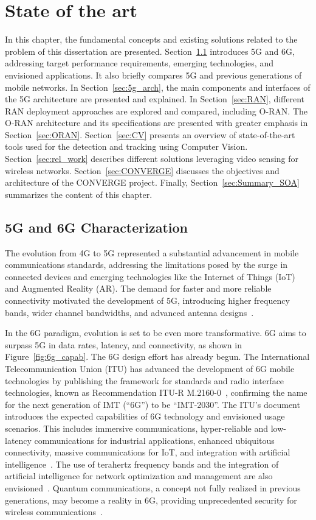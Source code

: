 \chapter{State of the art}\label{ch:state-of-the-art}

In this chapter, the fundamental concepts and existing solutions related to the problem of
this dissertation are presented.
Section~\ref{sec:6g_charac} introduces 5G and 6G, addressing target performance requirements, emerging technologies, and envisioned applications.
It also briefly compares 5G and previous generations of mobile networks.
In Section~\ref{sec:5g_arch}, the main components and interfaces of the 5G architecture are presented and explained.
In Section~\ref{sec:RAN}, different RAN deployment approaches are explored and compared, including O-RAN. The O-RAN architecture and its specifications are presented with greater emphasis in Section~\ref{sec:ORAN}.
Section~\ref{sec:CV} presents an overview of state-of-the-art tools used for the detection and tracking using Computer Vision.
Section~\ref{sec:rel_work} describes different solutions leveraging video sensing for wireless networks.
Section~\ref{sec:CONVERGE} discusses the objectives and architecture of the CONVERGE project.
Finally, Section~\ref{sec:Summary_SOA} summarizes the content of this chapter.

\section{5G and 6G Characterization} \label{sec:6g_charac}
The evolution from 4G to 5G represented a substantial advancement in mobile communications standards, addressing the limitations posed by the surge in connected devices and emerging technologies like the Internet of Things (IoT) and Augmented Reality (AR). The demand for faster and more reliable connectivity motivated the development of 5G, introducing higher frequency bands, wider channel bandwidths, and advanced antenna designs~\cite{5G_apps}.

In the 6G paradigm, evolution is set to be even more transformative.
6G aims to surpass 5G in data rates, latency, and connectivity, as shown in Figure~\ref{fig:6g_capab}.
The 6G design effort has already begun.
The International Telecommunication Union (ITU) has advanced the development of 6G mobile technologies by publishing the framework for standards and radio interface technologies, known as Recommendation ITU-R M.2160-0~\cite{ITU_2160-0}, confirming the name for the next generation of IMT (“6G”) to be “IMT-2030”.
The ITU's document introduces the expected capabilities of 6G technology and envisioned usage scenarios.
This includes immersive communications, hyper-reliable and low-latency communications for industrial applications, enhanced ubiquitous connectivity, massive communications for IoT, and integration with artificial intelligence~\cite{6G_ITU}.
The use of terahertz frequency bands and the integration of artificial intelligence for network optimization and management are also envisioned~\cite{6G_ITU}.
Quantum communications, a concept not fully realized in previous generations, may become a reality in 6G, providing unprecedented security for wireless communications~\cite{6G_ITU}.

